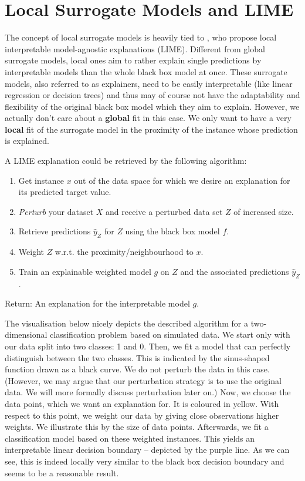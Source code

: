 \documentclass[]{krantz}
\begin{document}
\section{Local Surrogate Models and
LIME}\label{local-surrogate-models-and-lime}

The concept of local surrogate models is heavily tied to
\citet{ribeiro2016should}, who propose local interpretable
model-agnostic explanations (LIME). Different from global surrogate
models, local ones aim to rather explain single predictions by
interpretable models than the whole black box model at once. These
surrogate models, also referred to as explainers, need to be easily
interpretable (like linear regression or decision trees) and thus may of
course not have the adaptability and flexibility of the original black
box model which they aim to explain. However, we actually don't care
about a \textbf{global} fit in this case. We only want to have a very
\textbf{local} fit of the surrogate model in the proximity of the
instance whose prediction is explained.

A LIME explanation could be retrieved by the following algorithm:

\begin{enumerate}
\def\labelenumi{\arabic{enumi}.}
\item
  Get instance \(x\) out of the data space for which we desire an
  explanation for its predicted target value.
\item
  \emph{Perturb} your dataset \(X\) and receive a perturbed data set
  \(Z\) of increased size.
\item
  Retrieve predictions \(\hat{y}_{Z}\) for \(Z\) using the black box
  model \(f\).
\item
  Weight \(Z\) w.r.t. the proximity/neighbourhood to \(x\).
\item
  Train an explainable weighted model \(g\) on \(Z\) and the associated
  predictions \(\hat{y}_{Z}\).
\end{enumerate}

Return: An explanation for the interpretable model \(g\).

The visualisation below nicely depicts the described algorithm for a
two-dimensional classification problem based on simulated data. We start
only with our data split into two classes: 1 and 0. Then, we fit a model
that can perfectly distinguish between the two classes. This is
indicated by the sinus-shaped function drawn as a black curve. We do not
perturb the data in this case. (However, we may argue that our
perturbation strategy is to use the original data. We will more formally
discuss perturbation later on.) Now, we choose the data point, which we
want an explanation for. It is coloured in yellow. With respect to this
point, we weight our data by giving close observations higher weights.
We illustrate this by the size of data points. Afterwards, we fit a
classification model based on these weighted instances. This yields an
interpretable linear decision boundary -- depicted by the purple line.
As we can see, this is indeed locally very similar to the black box
decision boundary and seems to be a reasonable result.
\end{document}
